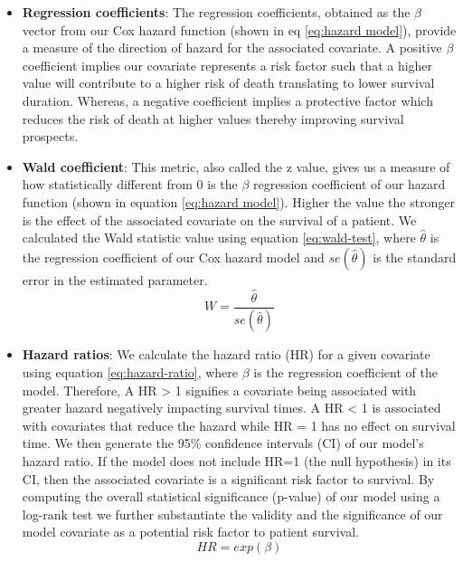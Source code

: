 \documentclass{l4proj}
\begin{document}
\begin{itemize}
    \item \textbf{Regression coefficients}: The regression coefficients, obtained as the \(\beta\) vector from our Cox hazard function (shown in eq \ref{eq:hazard model}), provide a measure of the direction of hazard for the associated covariate. A positive \(\beta\) coefficient implies our covariate represents a risk factor such that a higher value will contribute to a higher risk of death translating to lower survival duration. Whereas, a negative coefficient implies a protective factor which reduces the risk of death at higher values thereby improving survival prospects. 
    
    \item \textbf{Wald coefficient}: This metric, also called the z value, gives us a measure of how statistically different from 0 is the \(\beta\) regression coefficient of our hazard function (shown in equation \ref{eq:hazard model}). Higher the value the stronger is the effect of the associated covariate on the survival of a patient. We calculated the Wald statistic value using equation \ref{eq:wald-test}, where \(\hat{\theta}\) is the regression coefficient of our Cox hazard model and \(se(\hat{\theta})\) is the standard error in the estimated parameter. 
    \begin{equation} \label{eq:wald-test}
        W = \frac{\hat{\theta}}{se(\hat{\theta})}
    \end{equation}
    
    \item \textbf{Hazard ratios}: We calculate the hazard ratio (HR) for a given covariate using equation \ref{eq:hazard-ratio}, where \(\beta\) is the regression coefficient of the model. Therefore, A HR > 1 signifies a covariate being associated with greater hazard negatively impacting survival times. A HR < 1 is associated with covariates that reduce the hazard while HR = 1 has no effect on survival time. We then generate the 95\% confidence intervals (CI) of our model's hazard ratio. If the model does not include HR=1 (the null hypothesis) in its CI, then the associated covariate is a significant risk factor to survival. By computing the overall statistical significance (p-value) of our model using a log-rank test we further substantiate the validity and the significance of our model covariate as a potential risk factor to patient survival. 
    \begin{equation}\label{eq:hazard-ratio}
        HR = exp(\beta)
    \end{equation}

\end{itemize}
\end{document}
